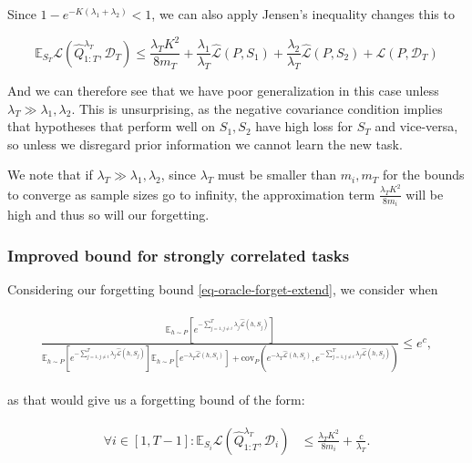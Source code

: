\documentclass[letterpaper]{article}
\theoremstyle{definition}
\begin{document}
Since $1-e^{-K(\lambda_1+\lambda_2)}<1$, we can also apply Jensen's inequality changes this to 

$$
\mathbb{E}_{S_T}\mathcal{L}(\hat{Q}^{\lambda_T}_{1:T}, \mathcal{D}_T) \leq \frac{\lambda_T K^2}{8m_T}+\frac{\lambda_1}{\lambda_T}\hat{\mathcal{L}}(P,S_1)+\frac{\lambda_2}{\lambda_T}\hat{\mathcal{L}}(P,S_2)+\mathcal{L}(P,\mathcal{D}_T)
$$

And we can therefore see that we have poor generalization in this case unless $\lambda_T\gg \lambda_1,\lambda_2$. This is unsurprising, as the negative covariance condition implies that hypotheses that perform well on $S_1,S_2$ have high loss for $S_T$ and vice-versa, so unless we disregard prior information we cannot learn the new task.

We note that if $\lambda_T\gg \lambda_1,\lambda_2$, since $\lambda_T$ must be smaller than $m_i,m_T$ for the bounds to converge as sample sizes go to infinity, 
the approximation term $\frac{\lambda_T K^2}{8m_i}$ will be high and thus so will our forgetting.

\subsubsection{Improved bound for strongly correlated tasks}

Considering our forgetting bound \eqref{eq-oracle-forget-extend}, we consider when 

\begin{align*} 
\begin{split}
\frac{\mathbb{E}_{h\sim P}\left [e^{-\sum_{j=1,j\neq i}^{T}\lambda_j\hat{\mathcal{L}}(h,S_j)} \right ]}{\mathbb{E}_{h\sim P}\left [e^{-\sum_{j=1,j\neq i}^{T}\lambda_j\hat{\mathcal{L}}(h,S_j)} \right ]\mathbb{E}_{h\sim P}\left [e^{-\lambda_T\hat{\mathcal{L}}(h,S_i)} \right ]+\mathrm{cov}_{P}(e^{-\lambda_T\hat{\mathcal{L}}(h,S_i)}, e^{-\sum_{j=1,j\neq i}^{T}\lambda_j\hat{\mathcal{L}}(h,S_j)})} \leq e^{c},
\end{split}
\end{align*}

as that would give us a forgetting bound of the form: 

\begin{align} \label{eq-oracle-forget-extend-best}
\begin{split}
\forall i\in[1,T-1]:
\mathbb{E}_{S_i}\mathcal{L}(\hat{Q}^{\lambda_T}_{1:T}, \mathcal{D}_i) &\leq \frac{\lambda_T K^2}{8m_i}+\frac{c}{\lambda_T}.
\end{split}
\end{align}
\end{document}
